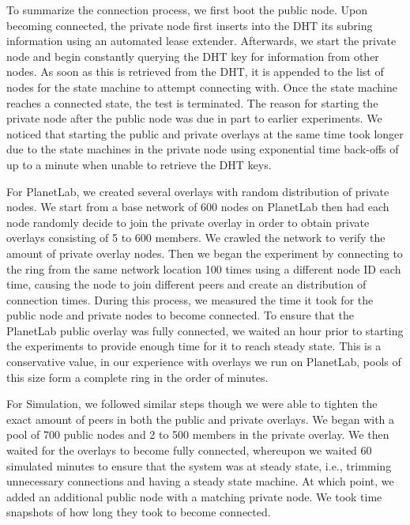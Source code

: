 \documentclass[conference]{IEEEtran}
\begin{document}
To summarize the connection process, we first boot the public node.  Upon
becoming connected, the private node first inserts into the DHT its 
subring information using an automated lease extender.  Afterwards, we
start the private node and begin constantly querying the DHT key for information
from other nodes.  As soon as this is retrieved from the DHT, it is appended to the list of
nodes for the state machine to attempt connecting with.  Once the state machine
reaches a connected state, the test is terminated.  The reason for starting
the private node after the public node was due in part to earlier experiments.
We noticed that starting the public and private overlays at the same time took
longer due to the state machines in the private node using exponential time
back-offs of up to a minute when unable to retrieve the DHT keys.

For PlanetLab, we created several overlays with random distribution of private
nodes.  We start from a base network of
600 nodes on PlanetLab then had each node randomly decide to join the private
overlay in order to obtain private overlays consisting of 5 to 600 members.  We
crawled the network to verify the amount of private overlay nodes.  Then we began
the experiment by connecting to the ring from the same network location 100 times
using a different node ID each time, causing the node to join different peers and
create an distribution of connection times. During this process, we measured the time it
took for the public node and private nodes to become connected.  To ensure that
the PlanetLab public overlay was fully connected, we waited an hour prior to starting the
experiments to provide enough time for it to reach steady state. This is a conservative
value, in our experience with overlays we run on PlanetLab, pools of this size form a complete
ring in the order of minutes.

For Simulation, we followed similar steps though we were able to tighten the
exact amount of peers in both the public and private overlays.  We began with a
pool of 700 public nodes and 2 to 500 members in the private overlay.  We then
waited for the overlays to become fully connected, whereupon we waited 60
simulated minutes to ensure that the system was at steady state, i.e., trimming
unnecessary connections and having a steady state machine.  At which point, we
added an additional public node with a matching private node.  We took time
snapshots of how long they took to become connected.
\end{document}

